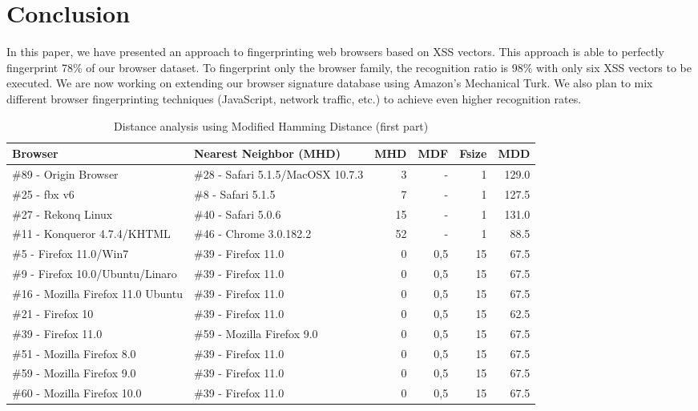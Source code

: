 \documentclass[10pt]{IEEEtran}
\begin{document}
\section{Conclusion}
\label{sec:conclusion}
In this paper, we have presented an approach to fingerprinting web browsers based on XSS vectors.
This approach is able to perfectly fingerprint 78\% of our browser dataset.
To fingerprint only the browser family, the recognition ratio is 98\% with only six XSS vectors to be executed.
We are now working on extending our browser signature database using Amazon's Mechanical Turk. 
We also plan to mix different browser fingerprinting techniques (JavaScript, network traffic, etc.) to achieve even higher recognition rates.
 



\begin{table*}[h]
  \centering
  \caption{Distance analysis using Modified Hamming Distance  (first part)}
    \begin{tabular}{llrrrr}
    \hline
    Browser & Nearest Neighbor (MHD) & MHD   & MDF   & Fsize & MDD \\
    \hline
    \#89 - Origin Browser & \#28 - Safari 5.1.5/MacOSX 10.7.3 & 3     & -     & 1     & 129.0 \\
    \#25 - fbx v6 & \#8 - Safari 5.1.5 & 7     & -     & 1     & 127.5 \\
    \#27 - Rekonq Linux & \#40 - Safari 5.0.6 & 15    & -     & 1     & 131.0 \\
    \#11 - Konqueror 4.7.4/KHTML & \#46 - Chrome 3.0.182.2 & 52    & -     & 1     & 88.5 \\
    \#5 - Firefox 11.0/Win7 & \#39 - Firefox 11.0 & 0     & 0,5   & 15    & 67.5 \\
    \#9 - Firefox 10.0/Ubuntu/Linaro & \#39 - Firefox 11.0 & 0     & 0,5   & 15    & 67.5 \\
    \#16 - Mozilla Firefox 11.0  Ubuntu & \#39 - Firefox 11.0 & 0     & 0,5   & 15    & 67.5 \\
    \#21 - Firefox 10 & \#39 - Firefox 11.0 & 0     & 0,5   & 15    & 62.5 \\
    \#39 - Firefox 11.0 & \#59 - Mozilla Firefox 9.0 & 0     & 0,5   & 15    & 67.5 \\
    \#51 - Mozilla Firefox 8.0 & \#39 - Firefox 11.0 & 0     & 0,5   & 15    & 67.5 \\
    \#59 - Mozilla Firefox 9.0 & \#39 - Firefox 11.0 & 0     & 0,5   & 15    & 67.5 \\
    \#60 - Mozilla Firefox 10.0 & \#39 - Firefox 11.0 & 0     & 0,5   & 15    & 67.5 \\

\end{tabular}
\end{table*}
\end{document}
